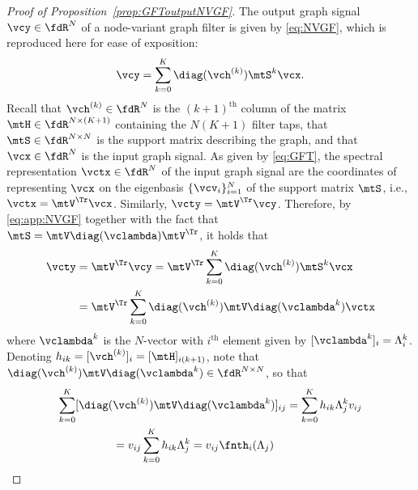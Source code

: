 \begin{proof}[Proof of Proposition~\ref{prop:GFToutputNVGF}]
The output graph signal $\vcy \in \fdR^{N}$ of a node-variant graph filter is given by \eqref{eq:NVGF}, which is reproduced here for ease of exposition:
\begin{equation} \label{eq:app:NVGF}
    \vcy = \sum_{k=0}^{K} \diag(\vch^{(k)}) \mtS^{k} \vcx.
\end{equation}
%
Recall that $\vch^{(k)} \in \fdR^{N}$ is the $(k+1)^{\text{th}}$ column of the matrix $\mtH \in \fdR^{N \times (K+1)}$ containing the $N(K+1)$ filter taps, that $\mtS \in \fdR^{N \times N}$ is the support matrix describing the graph, and that $\vcx \in \fdR^{N}$ is the input graph signal. As given by \eqref{eq:GFT}, the spectral representation $\vctx \in \fdR^{N}$ of the input graph signal are the coordinates of representing $\vcx$ on the eigenbasis $\{\vcv_{i}\}_{i=1}^N$ of the support matrix $\mtS$, i.e., $\vctx = \mtV^{\Tr} \vcx$. Similarly, $\vcty = \mtV^{\Tr} \vcy$. Therefore, by \eqref{eq:app:NVGF} together with the fact that $\mtS  = \mtV \diag(\vclambda) \mtV^{\Tr}$, it holds that
\begin{equation} \label{eq:app:NVGFoutputGFT}
%
\begin{aligned}
    \vcty & = \mtV^{\Tr} \vcy = \mtV^{\Tr} \sum_{k=0}^{K} \diag(\vch^{(k)}) \mtS^{k} \vcx \\ & = \mtV^{\Tr} \sum_{k=0}^{K} \diag(\vch^{(k)}) \mtV \diag(\vclambda^{k}) \vctx
\end{aligned}
%
\end{equation}
%
where $\vclambda^{k}$ is the $N$-vector with $i^\text{th}$ element given by $[\vclambda^{k}]_{i} = \lambda_{i}^{k}$. Denoting $h_{ik} = [\vch^{(k)}]_{i} = [\mtH]_{i(k+1)}$, note that $\diag(\vch^{(k)})\mtV \diag(\vclambda^{k}) \in \fdR^{N \times N}$, so that
\begin{equation}  \label{eq:app:diagVdiag}
%
\begin{aligned}
    \sum_{k=0}^{K} [\diag(& \vch^{(k)})\mtV \diag(\vclambda^{k})]_{ij}  = \sum_{k=0}^{K} h_{ik} \lambda_{j}^{k} v_{ij} \\ & = v_{ij} \sum_{k=0}^{K} h_{ik} \lambda_{j}^{k} = v_{ij} \fnth_{i}(\lambda_{j})

\end{aligned}
\end{equation}
\end{proof}
